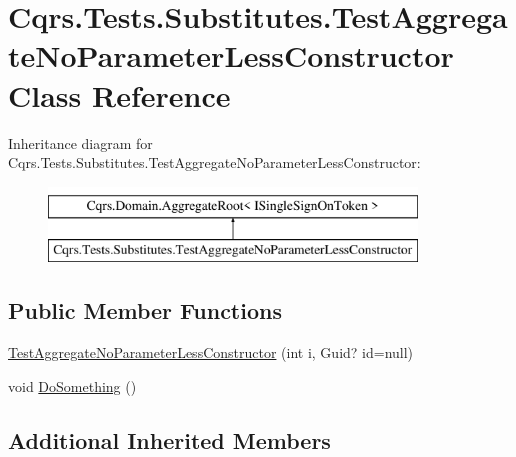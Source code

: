 \hypertarget{classCqrs_1_1Tests_1_1Substitutes_1_1TestAggregateNoParameterLessConstructor}{}\section{Cqrs.\+Tests.\+Substitutes.\+Test\+Aggregate\+No\+Parameter\+Less\+Constructor Class Reference}
\label{classCqrs_1_1Tests_1_1Substitutes_1_1TestAggregateNoParameterLessConstructor}
Inheritance diagram for Cqrs.\+Tests.\+Substitutes.\+Test\+Aggregate\+No\+Parameter\+Less\+Constructor\+:\begin{figure}[H]
\begin{center}
\leavevmode
\includegraphics[height=2.000000cm]{classCqrs_1_1Tests_1_1Substitutes_1_1TestAggregateNoParameterLessConstructor}
\end{center}
\end{figure}
\subsection*{Public Member Functions}
\begin{DoxyCompactItemize}
\item 
\hyperlink{classCqrs_1_1Tests_1_1Substitutes_1_1TestAggregateNoParameterLessConstructor_a4570a8f63619a4edc35f898e087159c6_a4570a8f63619a4edc35f898e087159c6}{Test\+Aggregate\+No\+Parameter\+Less\+Constructor} (int i, Guid? id=null)
\item 
void \hyperlink{classCqrs_1_1Tests_1_1Substitutes_1_1TestAggregateNoParameterLessConstructor_a5a5b9ab40339e27b2d3d0f08bfd24d0e_a5a5b9ab40339e27b2d3d0f08bfd24d0e}{Do\+Something} ()
\end{DoxyCompactItemize}
\subsection*{Additional Inherited Members}



